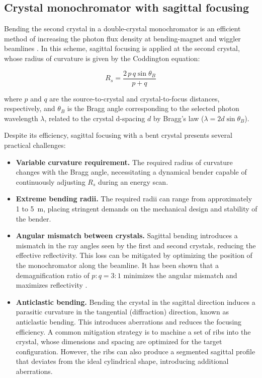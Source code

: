 \subsection{Crystal monochromator with sagittal focusing}

Bending the second crystal in a double-crystal monochromator is an efficient 
method of increasing the photon flux density at bending-magnet and wiggler 
beamlines \cite{Sparks1980,Sparks1982}. In this scheme, sagittal focusing is 
applied at the second crystal, whose radius of curvature is given by the 
Coddington equation:

\begin{equation}
    R_s = \frac{2\, p\, q \sin\theta_B}{p+q}
\end{equation}

\noindent where $p$ and $q$ are the source-to-crystal and crystal-to-focus 
distances, respectively, and $\theta_B$ is the Bragg angle corresponding to 
the selected photon wavelength $\lambda$, related to the crystal d-spacing $d$ 
by Bragg's law ($\lambda = 2d\sin\theta_B$).

Despite its efficiency, sagittal focusing with a bent crystal presents several 
practical challenges:

\begin{itemize}
    \item \textbf{Variable curvature requirement.} The required radius of 
    curvature changes with the Bragg angle, necessitating a dynamical bender 
    capable of continuously adjusting $R_s$ during an energy scan.

    \item \textbf{Extreme bending radii.} The required radii can range from 
    approximately 1 to 5~m, placing stringent demands on the mechanical design 
    and stability of the bender.

    \item \textbf{Angular mismatch between crystals.} Sagittal bending 
    introduces a mismatch in the ray angles seen by the first and second 
    crystals, reducing the effective reflectivity. This loss can be mitigated 
    by optimizing the position of the monochromator along the beamline. It has 
    been shown that a demagnification ratio of $p:q = 3:1$ minimizes the 
    angular mismatch and maximizes reflectivity \cite{Sparks1980}.

    \item \textbf{Anticlastic bending.} Bending the crystal in the sagittal 
    direction induces a parasitic curvature in the tangential (diffraction) 
    direction, known as anticlastic bending. This introduces aberrations and 
    reduces the focusing efficiency. A common mitigation strategy is to machine 
    a set of ribs into the crystal, whose dimensions and spacing are optimized 
    for the target configuration. However, the ribs can also produce a 
    segmented sagittal profile that deviates from the ideal cylindrical shape, 
    introducing additional aberrations.
\end{itemize}


